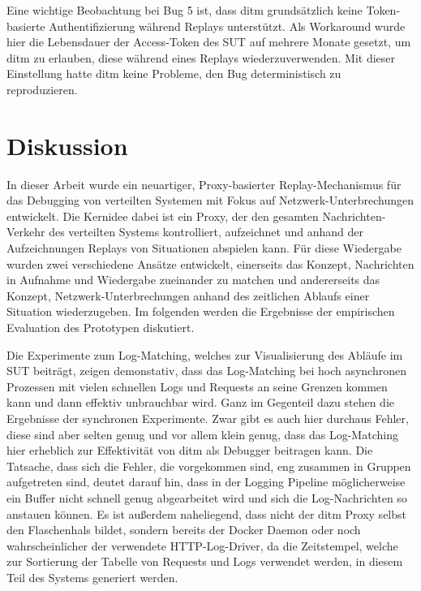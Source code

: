 \documentclass[12pt,a4paper]{report}
\begin{document}
Eine wichtige Beobachtung bei Bug 5 ist, dass ditm grundsätzlich keine Token-basierte Authentifizierung während Replays
unterstützt.
Als Workaround wurde hier die Lebensdauer der Access-Token
des SUT auf mehrere Monate gesetzt, um ditm zu erlauben, diese während eines Replays wiederzuverwenden. Mit dieser Einstellung
hatte ditm keine Probleme, den Bug deterministisch zu reproduzieren.

\chapter{Diskussion}
\label{chap:discussion}
In dieser Arbeit wurde ein neuartiger, Proxy-basierter Replay-Mechanismus für das Debugging von verteilten Systemen mit Fokus auf
Netzwerk-Unterbrechungen entwickelt. Die Kernidee dabei ist ein Proxy, der den gesamten Nachrichten-Verkehr des verteilten Systems
kontrolliert, aufzeichnet und anhand der Aufzeichnungen Replays von Situationen abspielen kann. Für diese Wiedergabe wurden zwei
verschiedene Ansätze entwickelt, einerseits das Konzept, Nachrichten in Aufnahme und Wiedergabe zueinander zu matchen und
andererseits das Konzept, Netzwerk-Unterbrechungen anhand des zeitlichen Ablaufs einer Situation wiederzugeben. Im folgenden
werden die Ergebnisse der empirischen Evaluation des Prototypen diskutiert.

Die Experimente zum Log-Matching, welches zur Visualisierung des Abläufe im SUT beiträgt, zeigen demonstativ, dass das
Log-Matching bei hoch asynchronen Prozessen mit vielen schnellen Logs und Requests an seine Grenzen kommen kann und dann effektiv
unbrauchbar wird. Ganz im Gegenteil dazu stehen die Ergebnisse der synchronen Experimente. Zwar gibt es auch hier durchaus Fehler,
diese sind aber selten genug und vor allem klein genug, dass das Log-Matching hier erheblich zur Effektivität von ditm als
Debugger beitragen kann. Die Tatsache, dass sich die Fehler, die vorgekommen sind, eng zusammen in Gruppen aufgetreten sind,
deutet darauf hin, dass in der Logging Pipeline möglicherweise ein Buffer nicht schnell genug abgearbeitet wird und sich die
Log-Nachrichten so anstauen können. Es ist außerdem naheliegend, dass nicht der ditm Proxy selbst den Flaschenhals bildet, sondern
bereits der Docker Daemon oder noch wahrscheinlicher der verwendete HTTP-Log-Driver, da die Zeitstempel, welche zur Sortierung der
Tabelle von Requests und Logs verwendet werden, in diesem Teil des Systems generiert werden.
\end{document}
